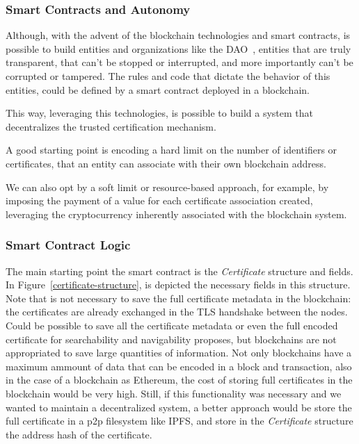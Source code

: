 \subsubsection{Smart Contracts and Autonomy}
Although, with the advent of the blockchain technologies and smart contracts, is possible to build entities and organizations like the DAO~\cite{ralphc.merkle2016}, entities that are truly transparent, that can't be stopped or interrupted, and more importantly can't be corrupted or tampered.
The rules and code that dictate the behavior of this entities, could be defined by a smart contract deployed in a blockchain.

This way, leveraging this technologies, is possible to build a system that decentralizes the trusted certification mechanism.

A good starting point is encoding a hard limit on the number of identifiers or certificates, that an entity can associate with their own blockchain address.

We can also opt by a soft limit or resource-based approach, for example, by imposing the payment of a value for each certificate association created, leveraging the cryptocurrency inherently associated with the blockchain system.

\subsubsection{Smart Contract Logic}
The main starting point the smart contract is the \textit{Certificate} structure and fields.
In Figure~\ref{certificate-structure}, is depicted the necessary fields in this structure.
Note that is not necessary to save the full certificate metadata in the blockchain: the certificates are already exchanged in the TLS handshake between the nodes.
Could be possible to save all the certificate metadata or even the full encoded certificate for searchability and navigability proposes, but blockchains are not appropriated to save large quantities of information.
Not only blockchains have a maximum ammount of data that can be encoded in a block and transaction, also in the case of a blockchain as Ethereum, the cost of storing full certificates in the blockchain would be very high.
Still, if this functionality was necessary and we wanted to maintain a decentralized system, a better approach would be store the full certificate in a \ac{p2p} filesystem like \ac{IPFS}, and store in the \textit{Certificate} structure the address hash of the certificate.

